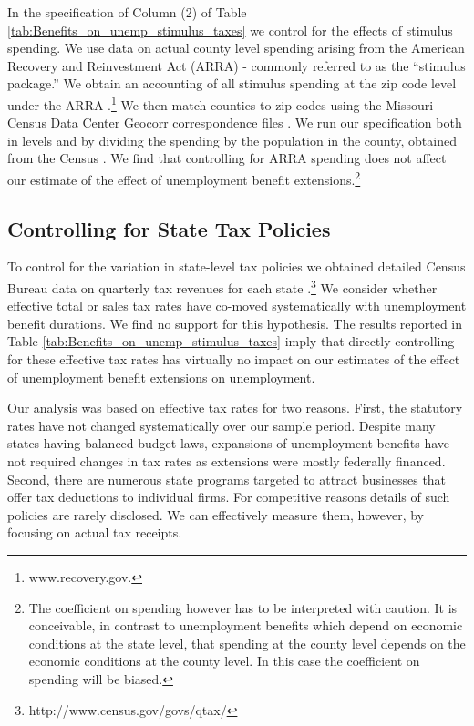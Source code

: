 \documentclass[12pt]{article}
\newcommand{\1}{\mathbf{1}}
\begin{document}
\begin{appendix}
In the specification of Column (2) of Table \ref{tab:Benefits_on_unemp_stimulus_taxes} we control for the effects of stimulus spending. We use data on actual county level spending arising from the American Recovery and Reinvestment Act (ARRA) - commonly referred to as the ``stimulus package.'' We obtain an accounting of all stimulus spending at the zip code level under the ARRA \citep{data:recoverygov-arra}.\footnote{www.recovery.gov.}  We then match counties to zip codes using the Missouri Census Data Center Geocorr correspondence files \citep{data:mcdc-geocorr}.  We run our specification both in levels and by dividing the spending by the population in the county, obtained from the Census \citep{data:census-popest}. We find that controlling for ARRA spending does not affect our estimate of the effect of unemployment benefit extensions.\footnote{The coefficient on spending however has to be interpreted with caution. It is conceivable, in contrast to unemployment benefits which depend on economic conditions at the state level, that spending at the county level depends
on the economic conditions at the county level. In this case the coefficient on spending will be biased.}


\subsection{Controlling for State Tax Policies}

To control for the variation in state-level tax policies we obtained detailed Census Bureau data on quarterly tax revenues for each state \citep{data:census-qtax}.\footnote{http://www.census.gov/govs/qtax/} We consider whether effective total or sales tax rates have co-moved systematically with unemployment benefit durations. We find no support for this hypothesis. The results reported in Table \ref{tab:Benefits_on_unemp_stimulus_taxes} imply that directly controlling for these effective tax rates has virtually no impact on our estimates of the effect of unemployment benefit extensions on unemployment.

Our analysis was based on effective tax rates for two reasons. First, the statutory rates have not changed systematically over our sample period. Despite many states having balanced budget laws, expansions of unemployment benefits have not required changes in tax rates as extensions were mostly federally financed. Second, there are numerous state programs targeted to attract businesses that offer tax deductions to individual firms. For competitive reasons details of such policies are rarely disclosed. We can effectively measure them, however, by focusing on actual tax receipts.



\end{appendix}
\end{document}
